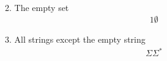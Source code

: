 \begin{enumerate}
\begin{enumerate}
\begin{align*}
                    \end{align*}
              \item The empty set
                    \begin{align*}
                        1\emptyset
                    \end{align*}
              \item All strings except the empty string
                    \begin{align*}
                        \Sigma\Sigma^\ast
                    \end{align*}
                    
          \end{enumerate}
\end{enumerate}
